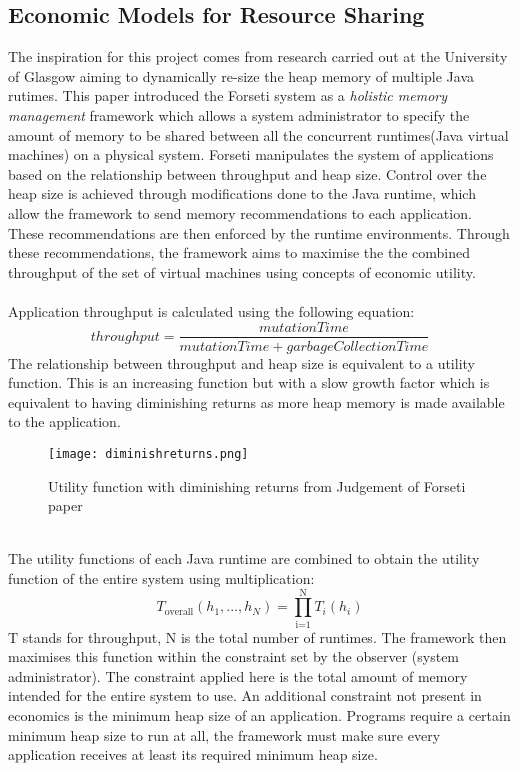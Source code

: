 \documentclass{l4proj}
\begin{document}
\subsection{Economic Models for Resource Sharing}
\hspace*{3em} The inspiration for this project comes from research carried out at the University of Glasgow aiming to dynamically re-size the heap memory of multiple Java rutimes.\cite{forseti} This paper introduced the Forseti system as a \textit{holistic memory management} framework which allows a system administrator to specify the amount of memory to be shared between all the concurrent runtimes(Java virtual machines) on a physical system. Forseti manipulates the system of applications based on the relationship between throughput and heap size. Control over the heap size is achieved through modifications done to the Java runtime, which allow the framework to send memory recommendations to each application. These recommendations are then enforced by the runtime environments. Through these recommendations, the framework aims to maximise the the combined throughput of the set of virtual machines using concepts of economic utility.     
\\\\
Application throughput is calculated using the following equation:
\begin{equation}
throughput = \dfrac{mutationTime}{mutationTime + garbageCollectionTime}
\end{equation}
The relationship between throughput and heap size is equivalent to a utility function. This is an increasing function but with a slow growth factor which is equivalent to having diminishing returns as more heap memory is made available to the application.\cite{forseti}
\begin{figure}[!ht]
  \centering
    \texttt{[image: diminishreturns.png]}
    \caption{Utility function with diminishing returns from Judgement of Forseti paper \cite{forseti}}
\end{figure}\\
\hspace*{3em} The utility functions of each Java runtime are combined to obtain the utility function of the entire system using multiplication:
\begin{equation}
T_\text{overall}(h_1,...,h_N) = \prod_\text{i=1}^\text{N}T_i(h_i) 
\end{equation}
T stands for throughput, N is the total number of runtimes. The framework then maximises this function within the constraint set by the observer (system administrator). The constraint applied here is the total amount of memory intended for the entire system to use. An additional constraint not present in economics is the minimum heap size of an application. Programs require a certain minimum heap size to run at all, the framework must make sure every application receives at least its required minimum heap size.\cite{forseti}
\end{document}
